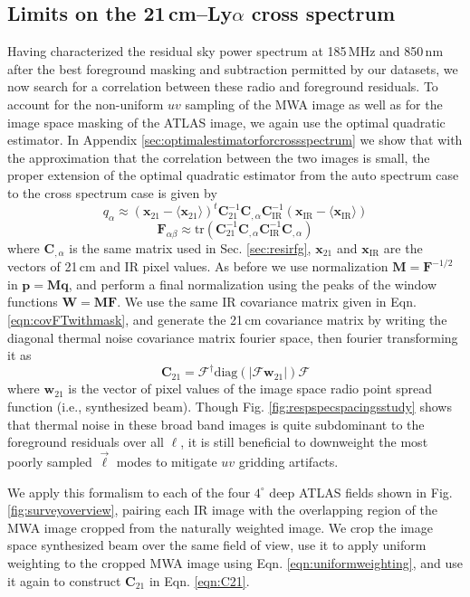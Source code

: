 \documentclass{emulateapj}
\newcommand{\IR}{\text{IR}}
\newcommand{\Fb}{\mathbf{F}}
\newcommand{\Mb}{\mathbf{M}}
\newcommand{\Cb}{\mathbf{C}}
\newcommand{\xb}{\mathbf{x}}
\newcommand{\pb}{\mathbf{p}}
\newcommand{\qb}{\mathbf{q}}
\newcommand{\Wb}{\mathbf{W}}
\begin{document}
\subsection{Limits on the 21\,cm--Ly$\alpha$ cross spectrum}

Having characterized the residual sky power spectrum at 185\,MHz and 850\,nm after the best foreground masking and subtraction permitted by our datasets, we now search for a correlation between these radio and foreground residuals. To account for the non-uniform $uv$ sampling of the MWA image as well as for the image space masking of the ATLAS image, we again use the optimal quadratic estimator. In Appendix \ref{sec:optimalestimatorforcrossspectrum} we show that with the approximation that the correlation between the two images is small, the proper extension of the optimal quadratic estimator from the auto spectrum case to the cross spectrum case is given by
\begin{equation}
q_\alpha \approx (\xb_{21}-\langle\xb_{21}\rangle)^t \Cb_{21}^{-1} \Cb_{,\alpha}\Cb_\IR^{-1}(\xb_\IR-\langle\xb_\IR\rangle)
\end{equation}
\begin{equation}
\Fb_{\alpha\beta}\approx\text{tr}\left(\Cb_{21}^{-1} \Cb_{,\alpha} \Cb_\IR^{-1}  \Cb_{,\alpha}  \right)	
\end{equation}
where $\Cb_{,\alpha}$ is the same matrix used in Sec. \ref{sec:resirfg}, $\mathbf{x}_{21}$ and $\mathbf{x}_{\IR}$ are the vectors of 21\,cm and IR pixel values. As before we use normalization $\Mb=\Fb^{-1/2}$ in $\pb=\Mb\qb$, and perform a final normalization using the peaks of the window functions $\Wb=\Mb\Fb$. We use the same IR covariance matrix given in Eqn. \ref{eqn:covFTwithmask}, and generate the 21\,cm covariance matrix by writing the diagonal thermal noise covariance matrix fourier space, then fourier transforming it as
\begin{equation}
\label{eqn:C21}
\Cb_{21} = \mathcal{F}^\dagger\text{diag}(|\mathcal{F}\mathbf{w}_{21}|)\mathcal{F}
\end{equation}
where $\mathbf{w}_{21}$ is the vector of pixel values of the image space radio point spread function (i.e., synthesized beam). Though Fig. \ref{fig:respspecspacingsstudy} shows that thermal noise in these broad band images is quite subdominant to the foreground residuals over all $\ell$, it is still beneficial to downweight the most poorly sampled $\vec{\ell}$ modes to mitigate $uv$ gridding artifacts. 

We apply this formalism to each of the four $4^\circ$ deep ATLAS fields shown in Fig. \ref{fig:surveyoverview}, pairing each IR image with the overlapping region of the MWA image cropped from the naturally weighted image. We crop the image space synthesized beam over the same field of view, use it to apply uniform weighting to the cropped MWA image using Eqn. \ref{eqn:uniformweighting}, and use it again to construct $\Cb_{21}$ in Eqn. \ref{eqn:C21}. 
\end{document}
